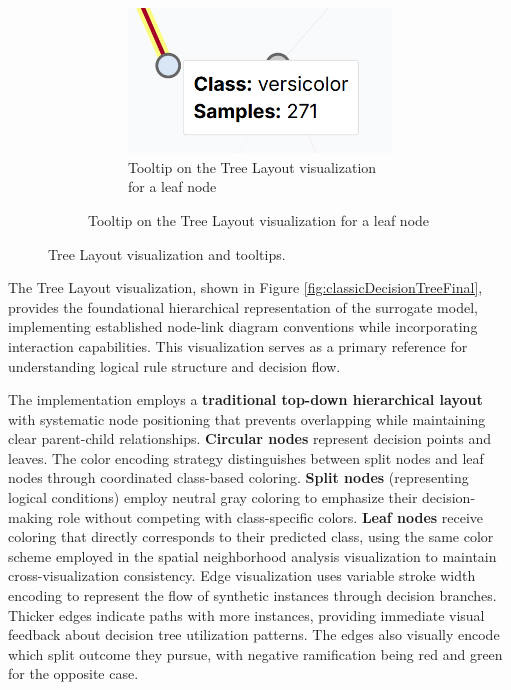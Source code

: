 \begin{figure}[ht!]
\begin{subfigure}[c]{0.28\textwidth}
\begin{subfigure}[c]{\linewidth}
            \label{fig:classicalDecisionTreeFinalTooltipSplit}
        \end{subfigure}
        \vspace{1cm}
        \begin{subfigure}[c]{\linewidth}
            \centering
            \includegraphics[width=\linewidth]{images/classicalDecisionTreeFinalTooltipLeaf.png}
            \caption{Tooltip on the Tree Layout visualization for a leaf node}
            \label{fig:classicalDecisionTreeFinalTooltipLeaf}
        \end{subfigure}
    \end{subfigure}
    
    \caption{Tree Layout visualization and tooltips.}
\end{figure}

The Tree Layout visualization, shown in Figure \ref{fig:classicDecisionTreeFinal}, provides the foundational hierarchical representation of the surrogate model, implementing established node-link diagram conventions while incorporating interaction capabilities. This visualization serves as a primary reference for understanding logical rule structure and decision flow.

The implementation employs a \textbf{traditional top-down hierarchical layout} with systematic node positioning that prevents overlapping while maintaining clear parent-child relationships. \textbf{Circular nodes} represent decision points and leaves.
% 
The color encoding strategy distinguishes between split nodes and leaf nodes through coordinated class-based coloring. \textbf{Split nodes} (representing logical conditions) employ neutral gray coloring to emphasize their decision-making role without competing with class-specific colors. \textbf{Leaf nodes} receive coloring that directly corresponds to their predicted class, using the same color scheme employed in the spatial neighborhood analysis visualization to maintain cross-visualization consistency.
%
Edge visualization uses variable stroke width encoding to represent the flow of synthetic instances through decision branches. Thicker edges indicate paths with more instances, providing immediate visual feedback about decision tree utilization patterns. 
The edges also visually encode which split outcome they pursue, with negative ramification being red and green for the opposite case.

